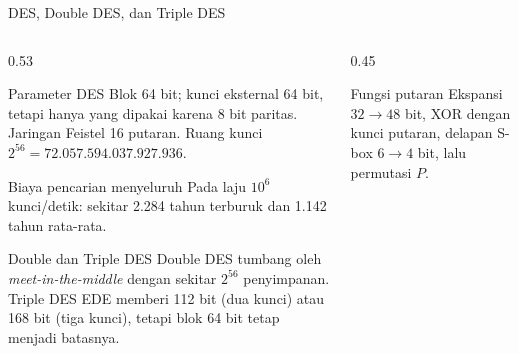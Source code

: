 \documentclass[aspectratio=169,11pt]{beamer}
\begin{document}
\begin{frame}{DES, Double DES, dan Triple DES}
    \begin{columns}[T,onlytextwidth]
        \begin{column}{0.53\textwidth}
            \scriptsize
            \begin{block}{Parameter DES}
                Blok 64 bit; kunci eksternal 64 bit, tetapi hanya
                 yang dipakai karena 8 bit paritas. Jaringan
                Feistel 16 putaran. Ruang kunci $2^{56} =
                72.057.594.037.927.936$.
            \end{block}
            \begin{exampleblock}{Biaya pencarian menyeluruh}
                Pada laju $10^6$ kunci/detik: sekitar 2.284 tahun terburuk dan
                1.142 tahun rata-rata.
            \end{exampleblock}
            \begin{block}{Double dan Triple DES}
                Double DES tumbang oleh \textit{meet-in-the-middle} dengan
                sekitar $2^{56}$ penyimpanan. Triple DES EDE memberi 112 bit
                (dua kunci) atau 168 bit (tiga kunci), tetapi blok 64 bit tetap
                menjadi batasnya.
            \end{block}
        \end{column}
        \begin{column}{0.45\textwidth}
            \centering
            \vspace{0.1cm}
            \begin{alertblock}{Fungsi putaran}
                \footnotesize
                Ekspansi $32\to48$ bit, XOR dengan kunci putaran, delapan S-box
                $6\to4$ bit, lalu permutasi $P$.
            \end{alertblock}
        \end{column}
    \end{columns}
\end{frame}
\end{document}
